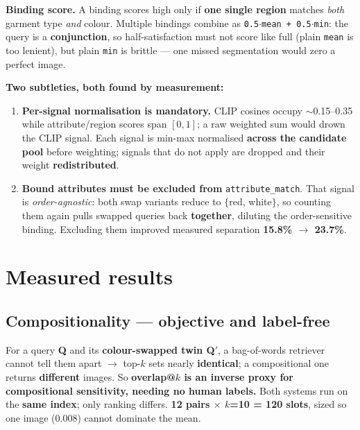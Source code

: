 \documentclass[10pt,a4paper]{article}
\newcommand{\tcode}[1]{\texttt{\small #1}}
\begin{document}
\textbf{Binding score.} A binding scores high only if \textbf{one single region} matches
\emph{both} garment type \emph{and} colour. Multiple bindings combine as
\tcode{0.5$\cdot$mean + 0.5$\cdot$min}: the query is a \textbf{conjunction}, so half-satisfaction
must not score like full (plain \tcode{mean} is too lenient), but plain \tcode{min} is brittle ---
one missed segmentation would zero a perfect image.

\textbf{Two subtleties, both found by measurement:}
\begin{enumerate}
  \item \textbf{Per-signal normalisation is mandatory.} CLIP cosines occupy $\sim$0.15--0.35 while
  attribute/region scores span $[0,1]$; a raw weighted sum would drown the CLIP signal. Each signal
  is min-max normalised \textbf{across the candidate pool} before weighting; signals that do not
  apply are dropped and their weight \textbf{redistributed}.
  \item \textbf{Bound attributes must be excluded from} \tcode{attribute\_match}. That signal is
  \emph{order-agnostic}: both swap variants reduce to $\{$red, white$\}$, so counting them again
  pulls swapped queries back \textbf{together}, diluting the order-sensitive binding. Excluding them
  improved measured separation \textbf{15.8\% $\rightarrow$ 23.7\%}.
\end{enumerate}

\section{Measured results}

\subsection{Compositionality --- objective and label-free}

For a query \textbf{Q} and its \textbf{colour-swapped twin Q$'$}, a bag-of-words retriever cannot
tell them apart $\rightarrow$ top-$k$ sets nearly \textbf{identical}; a compositional one returns
\textbf{different} images. So \textbf{overlap@$k$ is an inverse proxy for compositional sensitivity,
needing no human labels.} Both systems run on the \textbf{same index}; only ranking differs.
\textbf{12 pairs $\times$ $k$=10 = 120 slots}, sized so one image (0.008) cannot dominate the mean.
\end{document}
